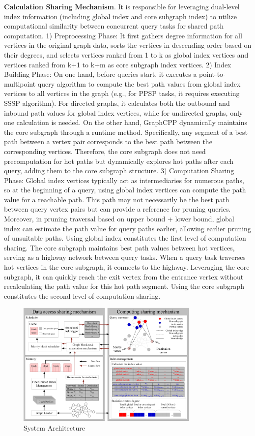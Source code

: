 \documentclass[lettersize,journal]{IEEEtran} %
\begin{document}
{\bf{Calculation Sharing Mechanism}}. It is responsible for leveraging dual-level index information (including global index and core subgraph index) to utilize computational similarity between concurrent query tasks for shared path computation. 1) Preprocessing Phase: It first gathers degree information for all vertices in the original graph data, sorts the vertices in descending order based on their degrees, and selects vertices ranked from 1 to k as global index vertices and vertices ranked from k+1 to k+m as core subgraph index vertices. 2) Index Building Phase: On one hand, before queries start, it executes a point-to-multipoint query algorithm to compute the best path values from global index vertices to all vertices in the graph (e.g., for PPSP tasks, it requires executing SSSP algorithm). For directed graphs, it calculates both the outbound and inbound path values for global index vertices, while for undirected graphs, only one calculation is needed. On the other hand, GraphCPP dynamically maintains the core subgraph through a runtime method. Specifically, any segment of a best path between a vertex pair corresponds to the best path between the corresponding vertices. Therefore, the core subgraph does not need precomputation for hot paths but dynamically explores hot paths after each query, adding them to the core subgraph structure. 3) Computation Sharing Phase: Global index vertices typically act as intermediaries for numerous paths, so at the beginning of a query, using global index vertices can compute the path value for a reachable path. This path may not necessarily be the best path between query vertex pairs but can provide a reference for pruning queries. Moreover, in pruning traversal based on upper bound + lower bound, global index can estimate the path value for query paths earlier, allowing earlier pruning of unsuitable paths. Using global index constitutes the first level of computation sharing. The core subgraph maintains best path values between hot vertices, serving as a highway network between query tasks. When a query task traverses hot vertices in the core subgraph, it connects to the highway. Leveraging the core subgraph, it can quickly reach the exit vertex from the entrance vertex without recalculating the path value for this hot path segment. Using the core subgraph constitutes the second level of computation sharing.

\begin{figure}[!t]
\centering
\includegraphics[width=3.5in]{系统架构.png}
\caption{System Architecture}  
\label{系统架构}
\end{figure}
 
\end{document}
